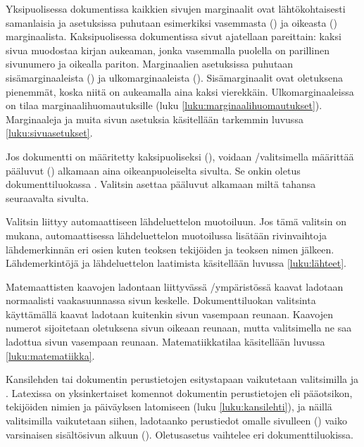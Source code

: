 Yksipuolisessa dokumentissa kaikkien sivujen marginaalit ovat
lähtökohtaisesti samanlaisia ja asetuksissa puhutaan esimerkiksi
vasemmasta () ja oikeasta ()
marginaalista. Kaksipuolisessa dokumentissa sivut ajatellaan pareittain:
kaksi sivua muodostaa kirjan aukeaman, jonka vasemmalla puolella on
parillinen sivunumero ja oikealla pariton. Marginaalien asetuksissa
puhutaan sisämarginaaleista () ja ulkomarginaaleista
(). Sisämarginaalit ovat oletuksena pienemmät, koska
niitä on aukeamalla aina kaksi vierekkäin. Ulkomarginaaleissa on tilaa
marginaalihuomautuksille (luku \ref{luku:marginaalihuomautukset}).
Marginaaleja ja muita sivun asetuksia käsitellään tarkemmin luvussa
\ref{luku:sivuasetukset}.

Jos%
 dokumentti on määritetty
kaksipuoliseksi (), voidaan
\-/valitsimella määrittää pääluvut () alkamaan aina oikeanpuoleiselta sivulta. Se onkin oletus
dokumenttiluokassa . Valitsin  asettaa
pääluvut alkamaan miltä tahansa seuraavalta sivulta.

Valitsin%
  liittyy automaattiseen
lähdeluettelon muotoiluun. Jos tämä valitsin on mukana, automaattisessa
lähdeluettelon muotoilussa lisätään rivinvaihtoja lähdemerkinnän eri
osien kuten teoksen tekijöiden ja teoksen nimen jälkeen. Lähdemerkintöjä
ja lähdeluettelon laatimista käsitellään luvussa \ref{luku:lähteet}.

Matemaattisten%
 kaavojen ladontaan liittyvässä
\-/ympäristössä kaavat ladotaan normaalisti
vaakasuunnassa sivun keskelle. Dokumenttiluokan valitsinta 
käyttämällä kaavat ladotaan kuitenkin sivun vasempaan reunaan. Kaavojen
numerot sijoitetaan oletuksena sivun oikeaan reunaan, mutta valitsimella
 ne saa ladottua sivun vasempaan reunaan. Matematiikkatilaa
käsitellään luvussa \ref{luku:matematiikka}.

Kansilehden%
 tai dokumentin perustietojen
esitystapaan vaikutetaan valitsimilla  ja
. Latexissa on yksinkertaiset komennot dokumentin
perustietojen eli pääotsikon, tekijöiden nimien ja päiväyksen latomiseen
(luku \ref{luku:kansilehti}), ja näillä valitsimilla vaikutetaan siihen,
ladotaanko perustiedot omalle sivulleen () vaiko
varsinaisen sisältösivun alkuun ().
Oletus\-asetus vaihtelee eri dokumenttiluokissa.

